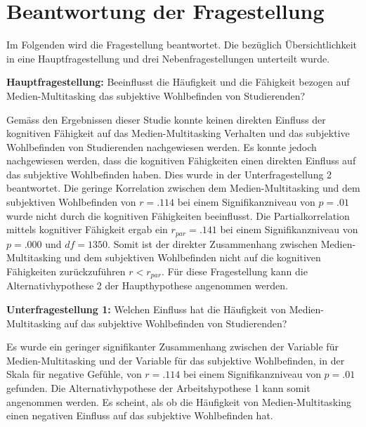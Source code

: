 \section{Beantwortung der Fragestellung}\label{section.diskussion.fragestellung}
Im Folgenden wird die Fragestellung beantwortet. Die bezüglich Übersichtlichkeit in eine Hauptfragestellung und drei Nebenfragestellungen unterteilt wurde. 
\par
\textbf{Hauptfragestellung:} Beeinflusst die Häufigkeit und die Fähigkeit bezogen auf Medien-Multitasking das subjektive Wohlbefinden von Studierenden?
\par
Gemäss den Ergebnissen dieser Studie konnte keinen direkten Einfluss der kognitiven Fähigkeit auf das Medien-Multitasking Verhalten und das subjektive Wohlbefinden von Studierenden nachgewiesen werden. Es konnte jedoch nachgewiesen werden, dass die kognitiven Fähigkeiten einen direkten Einfluss auf das subjektive Wohlbefinden haben. Dies wurde in der Unterfragestellung 2 beantwortet. Die geringe Korrelation zwischen dem Medien-Multitasking und dem subjektiven Wohlbefinden von $r=.114$ bei einem Signifikanzniveau von $p=.01$ wurde nicht durch die kognitiven Fähigkeiten beeinflusst. Die Partialkorrelation mittels kognitiver Fähigkeit ergab ein $r_{par}=.141$ bei einem Signifikanzniveau von $p=.000$ und $df=1350$. Somit ist der direkter Zusammenhang zwischen Medien-Multitasking und dem subjektiven Wohlbefinden nicht auf die kognitiven Fähigkeiten zurückzuführen $r<r_{par}$. Für diese Fragestellung kann die Alternativhypothese 2 der Haupthypothese angenommen werden.
\par
\textbf{Unterfragestellung 1:} Welchen Einfluss hat die Häufigkeit von Medien-Multitasking auf das subjektive Wohlbefinden von Studierenden?
\par
Es wurde ein geringer signifikanter Zusammenhang zwischen der Variable für Medien-Multitasking und der Variable für das subjektive Wohlbefinden, in der Skala für negative Gefühle, von $r=.114$ bei einem Signifikanzniveau von $p=.01$ gefunden. Die Alternativhypothese der Arbeitshypothese 1 kann somit angenommen werden. Es scheint, als ob die Häufigkeit von Medien-Multitasking einen negativen Einfluss auf das subjektive Wohlbefinden hat. \\
